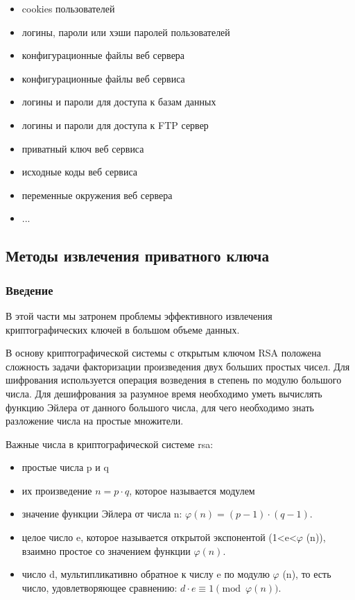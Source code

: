 \documentclass[20pt]{article}
\begin{document}
\begin{itemize}
  \item cookies пользователей
  \item логины, пароли или хэши паролей пользователей
  \item конфигурационные файлы веб сервера
  \item конфигурационные файлы веб сервиса
  \item логины и пароли для доступа к базам данных
  \item логины и пароли для доступа к FTP сервер
  \item приватный ключ веб сервиса
  \item исходные коды веб сервиса
  \item переменные окружения веб сервера
  \item ...
\end{itemize}

\subsection{Методы извлечения приватного ключа \cite{playing-hide-and-seek-with-stored-keys} }
\subsubsection{Введение}
В этой части мы затронем проблемы эффективного извлечения криптографических
ключей в большом объеме данных.

В основу криптографической системы с открытым ключом RSA положена сложность задачи
факторизации произведения двух больших простых чисел. Для шифрования используется
операция возведения в степень по модулю большого числа. Для дешифрования за
разумное время необходимо уметь вычислять функцию Эйлера от данного большого
числа, для чего необходимо знать разложение числа на простые множители.

Важные числа в криптографической системе rsa:
\begin{itemize}
  \item простые числа p и q
  \item их произведение $n=p \cdot q$, которое называется модулем
  \item значение функции Эйлера от числа n: $\varphi (n)=(p-1)\cdot (q-1)$.
  \item целое число e, которое называется открытой экспонентой
    (1<e<$\varphi$ (n)), взаимно простое со значением функции $\varphi(n)$.
  \item число d, мультипликативно обратное к числу e по модулю
    $\varphi$ (n), то есть число, удовлетворяющее сравнению: $d\cdot e\equiv 1{\pmod {\varphi (n)}}$.
\end{itemize}
\end{document}
